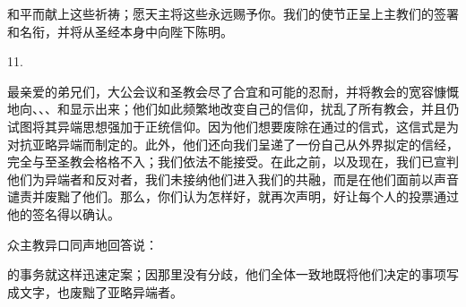 和平而献上这些祈祷；愿天主将这些永远赐予你。我们的使节正呈上主教们的签署和名衔，并将从圣经本身中向陛下陈明。\par

11. \par

最亲爱的弟兄们，大公会议和圣教会尽了合宜和可能的忍耐，并将教会的宽容慷慨地向、、、和显示出来；他们如此频繁地改变自己的信仰，扰乱了所有教会，并且仍试图将其异端思想强加于正统信仰。因为他们想要废除在通过的信式，这信式是为对抗亚略异端而制定的。此外，他们还向我们呈递了一份自己从外界拟定的信经，完全与至圣教会格格不入；我们依法不能接受。在此之前，以及现在，我们已宣判他们为异端者和反对者，我们未接纳他们进入我们的共融，而是在他们面前以声音谴责并废黜了他们。那么，你们认为怎样好，就再次声明，好让每个人的投票通过他的签名得以确认。\par

众主教异口同声地回答说：\par

的事务就这样迅速定案；因那里没有分歧，他们全体一致地既将他们决定的事项写成文字，也废黜了亚略异端者。\par

